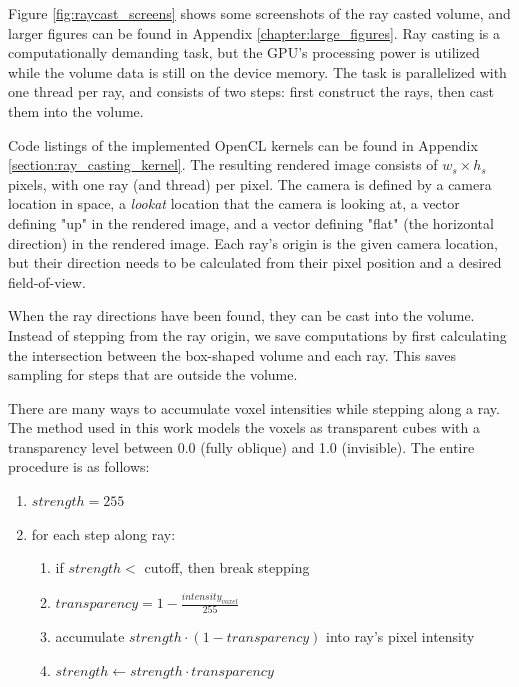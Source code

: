 Figure \ref{fig:raycast_screens} shows some screenshots of the ray casted volume, and larger figures can be found in Appendix \ref{chapter:large_figures}. Ray casting is a computationally demanding task, but the GPU's processing power is utilized while the volume data is still on the device memory. The task is parallelized with one thread per ray, and consists of two steps: first construct the rays, then cast them into the volume.

Code listings of the implemented OpenCL kernels can be found in Appendix \ref{section:ray_casting_kernel}. The resulting rendered image consists of $w_s \times h_s$ pixels, with one ray (and thread) per pixel. The camera is defined by a camera location in space, a \emph{lookat} location that the camera is looking at, a vector defining "up" in the rendered image, and a vector defining "flat" (the horizontal direction) in the rendered image. Each ray's origin is the given camera location, but their direction needs to be calculated from their pixel position and a desired field-of-view. %


When the ray directions have been found, they can be cast into the volume. Instead of stepping from the ray origin, we save computations by first calculating the intersection between the box-shaped volume and each ray. This saves sampling for steps that are outside the volume.

There are many ways to accumulate voxel intensities while stepping along a ray. The method used in this work models the voxels as transparent cubes with a transparency level between 0.0 (fully oblique) and 1.0 (invisible). The entire procedure is as follows:

\begin{enumerate}
	\item $strength = 255$
	\item for each step along ray:
	\begin{enumerate}
		\item if $strength <$ cutoff, then break stepping
		\item $transparency = 1-\frac{intensity_{voxel}}{255}$
		\item accumulate $strength \cdot (1-transparency)$ into ray's pixel intensity
		\item $strength \leftarrow strength \cdot transparency$
	\end{enumerate}
\end{enumerate}

